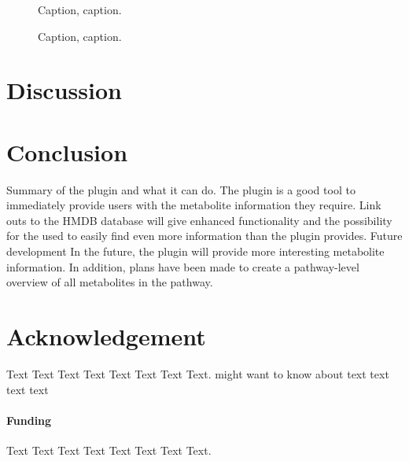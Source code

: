 \documentclass{bioinfo}
\begin{document}
\begin{figure}[!tpb]%
\caption{Caption, caption.}\label{fig:01}
\end{figure}

\begin{figure}[!tpb]%
\caption{Caption, caption.}\label{fig:02}
\end{figure}

\section{Discussion}




%
%






\section{Conclusion}

Summary of the plugin and what it can do.
The plugin is a good tool to immediately provide users with the metabolite information they require. Link outs to the HMDB database will give enhanced functionality and the possibility for the used to easily find even more information than the plugin provides.
Future development
In the future, the plugin will provide more interesting metabolite information. In addition, plans have been made to create a pathway-level overview of all metabolites in the pathway.


\section*{Acknowledgement}
Text Text Text Text Text Text  Text Text.  \citealp{Boffelli03} might want to know about  text text text text

\paragraph{Funding\textcolon} Text Text Text Text Text Text  Text Text.


%
%
%
%
%
%
%

\end{document}

